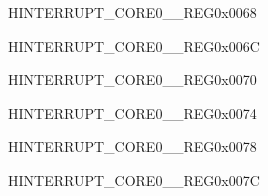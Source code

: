 \begin{register}{H}{INTERRUPT\_CORE0\_\_REG}{0x0068}\label{regdesc:INTERRUPTCORE0USBINTRMAPREG}






\end{register}\vspace{-3em}


\begin{register}{H}{INTERRUPT\_CORE0\_\_REG}{0x006C}\label{regdesc:INTERRUPTCORE0RTCCOREINTRMAPREG}






\end{register}\vspace{-3em}


\begin{register}{H}{INTERRUPT\_CORE0\_\_REG}{0x0070}\label{regdesc:INTERRUPTCORE0RMTINTRMAPREG}






\end{register}\vspace{-3em}


\begin{register}{H}{INTERRUPT\_CORE0\_\_REG}{0x0074}\label{regdesc:INTERRUPTCORE0I2CEXT0INTRMAPREG}






\end{register}\vspace{-3em}


\begin{register}{H}{INTERRUPT\_CORE0\_\_REG}{0x0078}\label{regdesc:INTERRUPTCORE0TIMERINT1MAPREG}






\end{register}\vspace{-3em}


\begin{register}{H}{INTERRUPT\_CORE0\_\_REG}{0x007C}\label{regdesc:INTERRUPTCORE0TIMERINT2MAPREG}






\end{register}\vspace{-3em}


